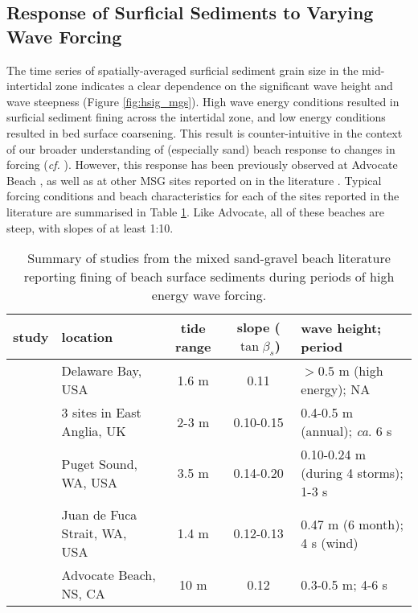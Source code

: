\documentclass[jmse,article,submit,pdftex,moreauthors]{Definitions/mdpi}
\begin{document}
\subsection{Response of Surficial Sediments to Varying Wave Forcing}\label{Discussion:StormFining}

The time series of spatially-averaged surficial sediment grain size in the mid-intertidal zone indicates a clear dependence on the significant wave height and wave steepness (Figure \ref{fig:hsig_mgs}). High wave energy conditions resulted in surficial sediment fining across the intertidal zone, and low energy conditions resulted in bed surface coarsening. This result is counter-intuitive in the context of our broader understanding of (especially sand) beach response to changes in forcing (\textit{cf.} \citep{Bascom1951, Masselink_etal2007}). However, this response has been previously observed at Advocate Beach \citep{Hay_etal2014}, as well as at other MSG sites reported on in the literature \citep{Nordstrom_Jackson1993, Pontee_etal2004, Curtiss_etal2009, Miller_etal2011}. Typical forcing conditions and beach characteristics for each of the sites reported in the literature are summarised in Table \ref{table:beach_summary}. Like Advocate, all of these beaches are steep, with slopes of at least 1:10.

\startlandscape
	\begin{table}[tbp!]
		\caption[Mixed sand-gravel beaches: summary of reported beach surface fining during storms]{Summary of studies from the mixed sand-gravel beach literature reporting fining of beach surface sediments during periods of high energy wave forcing.\label{table:beach_summary}} 
		\centering
		\begin{tabular}{llccl}
			\hline
			study & location & tide range & slope ($\tan\beta_s$) & wave height; period\\
			\hline
			\citet{Nordstrom_Jackson1993} & Delaware Bay, USA & 1.6 m & 0.11 & $>0.5$ m (high energy); NA\\
			\citet{Pontee_etal2004} & 3 sites in East Anglia, UK & 2-3 m & 0.10-0.15 & 0.4-0.5 m (annual); \textit{ca}. 6 s\\
			\citet{Curtiss_etal2009} & Puget Sound, WA, USA & 3.5 m & 0.14-0.20 & 0.10-0.24 m (during 4 storms); 1-3 s\\
			\citet{Miller_etal2011} & Juan de Fuca Strait, WA, USA & 1.4 m & 0.12-0.13 & 0.47 m (6 month); 4 s (wind)\\%
			\citet{Hay_etal2014} & Advocate Beach, NS, CA & 10 m & 0.12 & 0.3-0.5 m; 4-6 s\\
			\hline
		\end{tabular}
	\end{table}
\finishlandscape
\end{document}
